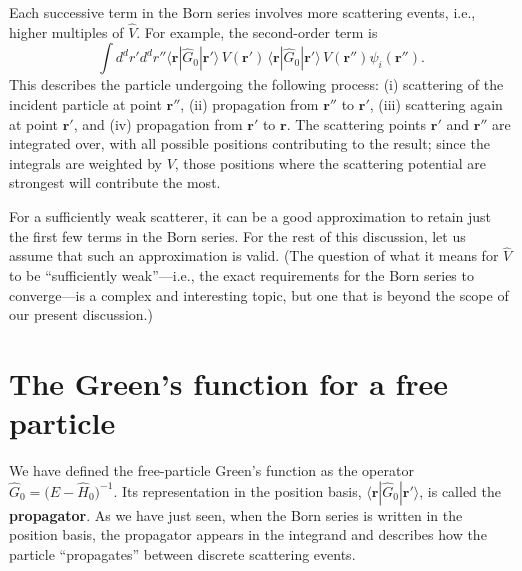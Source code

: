 \documentclass[pra,12pt]{revtex4}
\begin{document}
\noindent
Each successive term in the Born series involves more scattering
events, i.e., higher multiples of $\hat{V}$.  For example, the
second-order term is
\begin{equation*}
  \int d^dr' d^dr'' \langle \mathbf{r} | \hat{G}_0 |\mathbf{r}'\rangle\, V(\mathbf{r}') \, \langle \mathbf{r} | \hat{G}_0 |\mathbf{r}'\rangle \, V(\mathbf{r}'') \psi_i(\mathbf{r}'').
\end{equation*}
This describes the particle undergoing the following process: (i)
scattering of the incident particle at point $\mathbf{r}''$, (ii)
propagation from $\mathbf{r}''$ to $\mathbf{r}'$, (iii) scattering
again at point $\mathbf{r}'$, and (iv) propagation from $\mathbf{r}'$
to $\mathbf{r}$.  The scattering points $\mathbf{r}'$ and
$\mathbf{r}''$ are integrated over, with all possible positions
contributing to the result; since the integrals are weighted by $V$,
those positions where the scattering potential are strongest will
contribute the most.

For a sufficiently weak scatterer, it can be a good approximation to
retain just the first few terms in the Born series.  For the rest of
this discussion, let us assume that such an approximation is valid.
(The question of what it means for $\hat{V}$ to be ``sufficiently
weak''---i.e., the exact requirements for the Born series to
converge---is a complex and interesting topic, but one that is beyond
the scope of our present discussion.)

\section{The Green's function for a free particle}
\label{sec:freegreen}

We have defined the free-particle Green's function as the operator
$\hat{G}_0=\big(E-\hat{H}_0\big)^{-1}$.  Its representation in the
position basis, $\langle\mathbf{r}|\hat{G}_0|\mathbf{r}'\rangle$, is
called the \textbf{propagator}.  As we have just seen, when the Born
series is written in the position basis, the propagator appears in the
integrand and describes how the particle ``propagates'' between
discrete scattering events.
\end{document}

